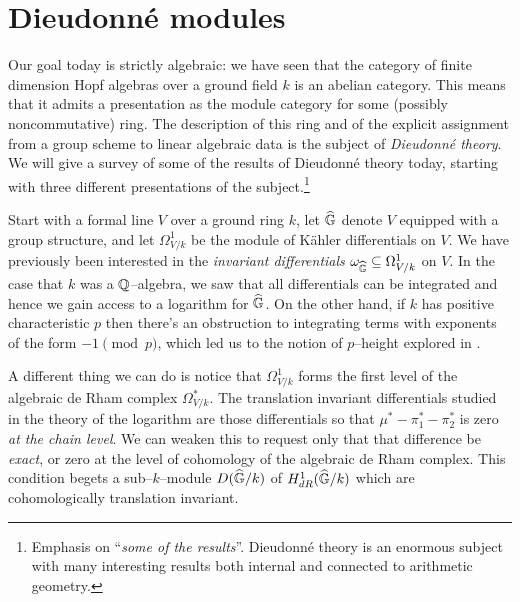 \section{Dieudonn\'e modules}

Our goal today is strictly algebraic: we have seen that the category of finite dimension Hopf algebras over a ground field $k$ is an abelian category.  This means that it admits a presentation as the module category for some (possibly noncommutative) ring.  The description of this ring and of the explicit assignment from a group scheme to linear algebraic data is the subject of \textit{Dieudonn\'e theory}.  We will give a survey of some of the results of Dieudonn\'e theory today, starting with three different presentations of the subject.\footnote{Emphasis on ``\emph{some of the results}''.  Dieudonn\'e theory is an enormous subject with many interesting results both internal and connected to arithmetic geometry.}

Start with a formal line $V$ over a ground ring $k$, let $\widehat{\mathbb G}$ denote $V$ equipped with a group structure, and let $\Omega^1_{V/k}$ be the module of K\"ahler differentials on $V$.  We have previously been interested in the \textit{invariant differentials} $\omega_{\widehat{\mathbb G}} \subseteq \Omega^1_{V/k}$ on $V$.  In the case that $k$ was a $\mathbb{Q}$--algebra, we saw that all differentials can be integrated and hence we gain access to a logarithm for $\widehat{\mathbb G}$.  On the other hand, if $k$ has positive characteristic $p$ then there's an obstruction to integrating terms with exponents of the form $-1 \pmod p$, which led us to the notion of $p$--height explored in .

A different thing we can do is notice that $\Omega^1_{V/k}$ forms the first level of the algebraic de Rham complex $\Omega^*_{V/k}$.  The translation invariant differentials studied in the theory of the logarithm are those differentials so that $\mu^* - \pi_1^* - \pi_2^*$ is zero \emph{at the chain level}.  We can weaken this to request only that that difference be \emph{exact}, or zero at the level of cohomology of the algebraic de Rham complex.  This condition begets a sub--$k$--module $D(\widehat{\mathbb G}/k)$ of $H^1_{dR}(\widehat{\mathbb G}/k)$ which are cohomologically translation invariant.

